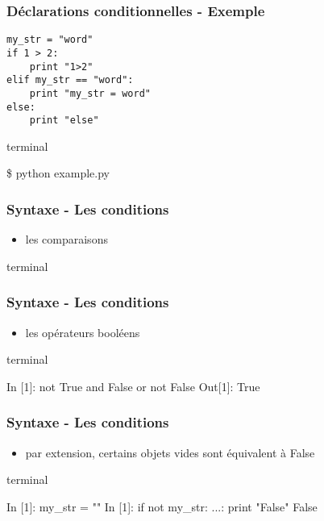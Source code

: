 \begin{frame}[fragile]
  \frametitle{Déclarations conditionnelles - Exemple}
  \begin{lstlisting}
my_str = "word"
if 1 > 2:
    print "1>2"
elif my_str == "word":
    print "my_str = word"
else:
    print "else"
  \end{lstlisting}

  \begin{beamercolorbox}{terminal}
  \begin{semiverbatim}
 \$ python example.py
  \end{semiverbatim}
  \end{beamercolorbox}

\end{frame}

\begin{frame}[fragile]
  \frametitle{Syntaxe - Les conditions}
  \begin{itemize}
    \item les comparaisons
  \end{itemize}
  \begin{beamercolorbox}{terminal}
  \begin{semiverbatim}

\end{semiverbatim}
    \end{beamercolorbox}
\end{frame}

\begin{frame}[fragile]
  \frametitle{Syntaxe - Les conditions}
  \begin{itemize}
    \item les opérateurs booléens
  \end{itemize}
  \begin{beamercolorbox}{terminal}
  \begin{semiverbatim}
 In [1]: not True and False or not False
 Out[1]: True\end{semiverbatim}
  \end{beamercolorbox}
\end{frame}

\begin{frame}[fragile]
  \frametitle{Syntaxe - Les conditions}
  \begin{itemize}
    \item par extension, certains objets vides sont équivalent à False
  \end{itemize}
  \begin{beamercolorbox}{terminal}
  \begin{semiverbatim}
 In [1]: my_str = ""
 In [1]: if not my_str:
    ...:     print "False"
 False\end{semiverbatim}
  \end{beamercolorbox}
\end{frame}

